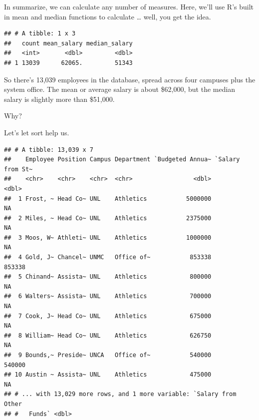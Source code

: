 \documentclass[]{book}
\newenvironment{Shaded}{\begin{snugshade}}{\end{snugshade}}
\newcommand{\DataTypeTok}[1]{\textcolor[rgb]{0.13,0.29,0.53}{#1}}
\newcommand{\KeywordTok}[1]{\textcolor[rgb]{0.13,0.29,0.53}{\textbf{#1}}}
\newcommand{\NormalTok}[1]{#1}
\newcommand{\OperatorTok}[1]{\textcolor[rgb]{0.81,0.36,0.00}{\textbf{#1}}}
\newcommand{\StringTok}[1]{\textcolor[rgb]{0.31,0.60,0.02}{#1}}
\begin{document}
In summarize, we can calculate any number of measures. Here, we'll use R's built in mean and median functions to calculate \ldots{} well, you get the idea.

\begin{Shaded}
\end{Shaded}

\begin{verbatim}
## # A tibble: 1 x 3
##   count mean_salary median_salary
##   <int>       <dbl>         <dbl>
## 1 13039      62065.         51343
\end{verbatim}

So there's 13,039 employees in the database, spread across four campuses plus the system office. The mean or average salary is about \$62,000, but the median salary is slightly more than \$51,000.

Why?

Let's let sort help us.

\begin{Shaded}
\end{Shaded}

\begin{verbatim}
## # A tibble: 13,039 x 7
##    Employee Position Campus Department `Budgeted Annua~ `Salary from St~
##    <chr>    <chr>    <chr>  <chr>                 <dbl>            <dbl>
##  1 Frost, ~ Head Co~ UNL    Athletics           5000000               NA
##  2 Miles, ~ Head Co~ UNL    Athletics           2375000               NA
##  3 Moos, W~ Athleti~ UNL    Athletics           1000000               NA
##  4 Gold, J~ Chancel~ UNMC   Office of~           853338           853338
##  5 Chinand~ Assista~ UNL    Athletics            800000               NA
##  6 Walters~ Assista~ UNL    Athletics            700000               NA
##  7 Cook, J~ Head Co~ UNL    Athletics            675000               NA
##  8 William~ Head Co~ UNL    Athletics            626750               NA
##  9 Bounds,~ Preside~ UNCA   Office of~           540000           540000
## 10 Austin ~ Assista~ UNL    Athletics            475000               NA
## # ... with 13,029 more rows, and 1 more variable: `Salary from Other
## #   Funds` <dbl>
\end{verbatim}
\end{document}
